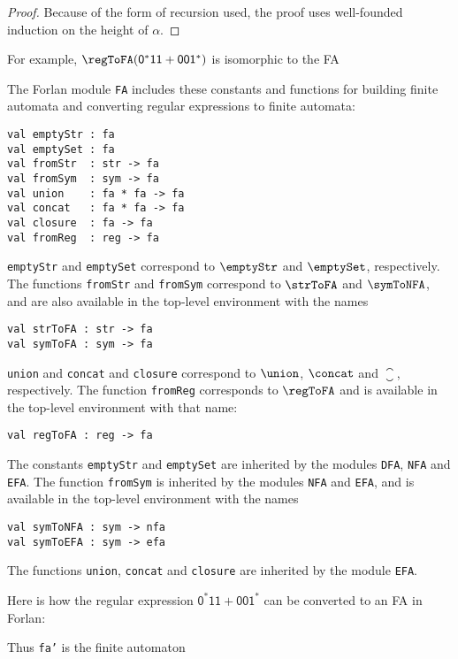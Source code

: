 \begin{proof}
Because of the form of recursion used, the proof uses well-founded
induction on the height of $\alpha$.
\end{proof}

For example, $\regToFA(\mathsf{0^*11+001^*})$ is isomorphic to
the FA
\begin{center}

\end{center}

The Forlan module \texttt{FA} includes these constants and functions
for building finite automata and converting regular expressions to
finite automata:
\begin{verbatim}
val emptyStr : fa
val emptySet : fa
val fromStr  : str -> fa
val fromSym  : sym -> fa
val union    : fa * fa -> fa
val concat   : fa * fa -> fa
val closure  : fa -> fa
val fromReg  : reg -> fa
\end{verbatim}
\texttt{emptyStr} and \texttt{emptySet} correspond to $\emptyStr$ and
$\emptySet$, respectively.
The functions \texttt{fromStr} and \texttt{fromSym} correspond to
$\strToFA$ and $\symToNFA$, and are also available in the top-level
environment with the names
\begin{verbatim}
val strToFA : str -> fa
val symToFA : sym -> fa
\end{verbatim}
\texttt{union} and \texttt{concat} and \texttt{closure} correspond to
$\union$, $\concat$ and $\closure$, respectively.
The function \texttt{fromReg} corresponds to $\regToFA$ and is
available in the top-level environment with that name:
\begin{verbatim}
val regToFA : reg -> fa
\end{verbatim}

The constants \texttt{emptyStr} and \texttt{emptySet} are inherited by
the modules \texttt{DFA}, \texttt{NFA} and \texttt{EFA}.
The function \texttt{fromSym} is inherited by
the modules \texttt{NFA} and \texttt{EFA}, and is available in
the top-level environment with the names
\begin{verbatim}
val symToNFA : sym -> nfa
val symToEFA : sym -> efa
\end{verbatim}
The functions \texttt{union}, \texttt{concat} and \texttt{closure} are
inherited by the module \texttt{EFA}.

Here is how the regular expression $\mathsf{0^*11+001^*}$ can
be converted to an FA in Forlan:

Thus \texttt{fa'} is the finite automaton
\begin{center}

\end{center}

